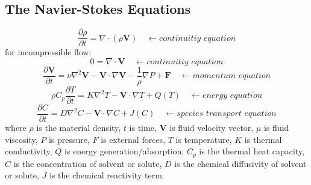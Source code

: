\documentclass[12pt]{extarticle}
\begin{document}
\subsection*{The Navier-Stokes Equations}
\begin{equation}
\frac{\partial \rho}{\partial t} = \nabla \cdot  (\rho \textbf{V})   \quad \leftarrow \textit{continuitiy equation}
\end{equation}
for incompressible flow:
\begin{equation}
0 = \nabla \cdot \textbf{V}     \quad \leftarrow \textit{continuitiy equation}
\end{equation}
\begin{equation}
\frac{\partial \textbf{V}}{\partial t} = \nu \nabla^{2} \textbf{V} - \textbf{V} \cdot \nabla \textbf{V} - \frac{1}{\rho} \nabla P + \textbf{F}    \quad \leftarrow \textit{momentum equation}
\end{equation}
\begin{equation}
\rho C_{p} \frac{\partial T}{\partial t} = K \nabla^{2} T - \textbf{V} \cdot  \nabla T + Q(T) \quad \leftarrow \textit{energy equation}
\end{equation}
\begin{equation}
\frac{\partial C}{\partial t} = D \nabla^{2} C - \textbf{V} \cdot  \nabla C + J(C) \quad \leftarrow \textit{species transport equation}
\end{equation}
where $\rho$ is the material density, $t$ is time, $\textbf{V}$ is fluid velocity vector, $\mu$ is fluid viscosity, $P$ is pressure, $F$ is external forces, $T$ is temperature, $K$ is thermal conductivity, $Q$ is energy generation/absorption, $C_{p}$ is the thermal heat capacity, $C$ is the concentration of solvent or solute, $D$ is the chemical diffusivity of solvent or solute, $J$ is the chemical reactivity term.
\end{document}

